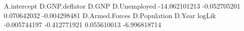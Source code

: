 \begin{Schunk}
\begin{Soutput}
   A.intercept D.GNP.deflator          D.GNP   D.Unemployed 
 -14.062101213   -0.052705201    0.070642032   -0.004298481 
D.Armed.Forces   D.Population         D.Year         logLik 
  -0.005744197   -0.412771921    0.055610013   -6.996818714 
\end{Soutput}
\end{Schunk}
